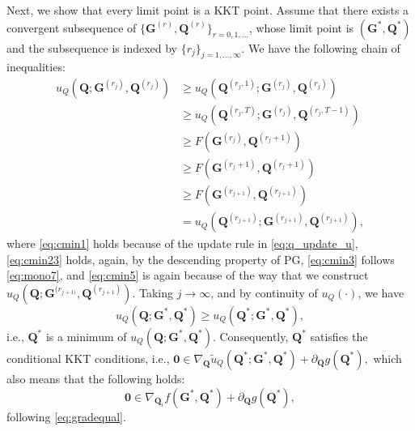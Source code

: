 \documentclass[10pt,journal]{IEEEtran}
\newcommand{\Q}{\boldsymbol{Q}}
\begin{document}
Next, we show that every limit point is a KKT point.
Assume that there exists a convergent subsequence of $\{{\bm G}^{(r)},{\bm Q}^{(r)}\}_{r=0,1,\ldots}$,
whose limit point is $({\bm G}^\ast,{\bm Q}^\ast)$ and the subsequence is indexed by $\{r_j\}_{j=1,\ldots,\infty}$.
We have the following chain of inequalities:
\begin{subequations}\label{eq:u_Q}
\begin{align}
         u_Q\left({\bm Q};{\bm G}^{(r_j)},{\bm Q}^{(r_j)}\right) &\geq u_Q\left({\bm Q}^{(r_j,1)};{\bm G}^{(r_j)},{\bm Q}^{(r_j)}\right) \label{eq:cmin1}\\
				                               &\geq u_Q\left({\bm Q}^{(r_j,T)};{\bm G}^{(r_j)},{\bm Q}^{(r_j,T-1)}\right) \label{eq:cmin23}\\
				                              &\geq F({\bm G}^{(r_j)},{\bm Q}^{(r_j+1)})\label{eq:cmin24}\\					
                                               &\geq F\left({\bm G}^{(r_j+1)},{\bm Q}^{(r_j+1)}\right)  \label{eq:cmin3}\\
											  &\geq F\left({\bm G}^{(r_{j+1})},{\bm Q}^{(r_{j+1})}\right)  \label{eq:cmin4}\\
											   & = u_Q\left({\bm Q}^{(r_{j+1})};{\bm G}^{(r_{j+1})},{\bm Q}^{(r_{j+1})}\right), \label{eq:cmin5}
\end{align}
\end{subequations}
where \eqref{eq:cmin1} holds because of the update rule in \eqref{eq:q_update_u},
\eqref{eq:cmin23} holds, again, by the descending property of PG,
\eqref{eq:cmin3} follows \eqref{eq:mono7},
and \eqref{eq:cmin5} is again because of the way that we construct $u_Q({\bm Q};{\bm G}^{(r_{j+1)}},{\bm Q}^{(r_{j+1})})$.
Taking $j\rightarrow \infty$, and by continuity of $u_Q(\cdot)$, we have
\begin{equation}
	    u_Q({\bm Q};{\bm G}^{\ast},{\bm Q}^\ast) \geq  u_Q({\bm Q}^\ast;{\bm G}^{\ast},{\bm Q}^\ast),
\end{equation}
i.e., ${\bm Q}^{\ast}$ is a minimum of $u_Q({\bm Q};{\bm G}^{\ast},{\bm Q}^\ast)$.
Consequently, ${\bm Q}^{\ast}$ satisfies the conditional KKT conditions, i.e.,
$	 {\bm 0} \in  \nabla_{{\bm Q}} \tilde{u}_Q({\bm Q}^\ast;{\bm G}^{\ast},{\bm Q}^\ast) + \partial_{\Q}g(\Q^\ast),$
which also means that the following holds:
\begin{equation}\label{eq:QKKT}
	     {\bm 0} \in \nabla_{{\bm Q}_i} f({\bm G}^{\ast},{\bm Q}^\ast) + \partial_{\Q}g(\Q^\ast) ,
\end{equation}
following \eqref{eq:gradequal}.
\end{document}
